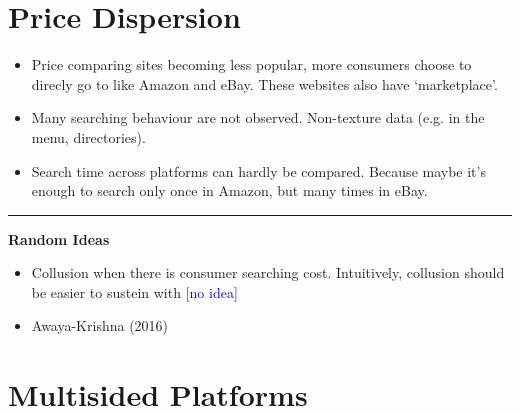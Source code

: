 \documentclass{book}
\theoremstyle{plain}
\theoremstyle{definition}
\newcommand{\myline}{\vspace{3mm} \hrule \vspace{4mm}}
\begin{document}




\section{Price Dispersion} %
\label{sec:price_dispersion}

\textbf{}

\begin{itemize}
	\item Price comparing sites becoming less popular,
	more consumers choose to direcly go to like Amazon and eBay.
	These websites also have `marketplace'.
	\item Many searching behaviour are not observed. Non-texture data (e.g. in the menu, directories).
	\item Search time across platforms can hardly be compared.
	Because maybe it's enough to search only once in Amazon, 
	but many times in eBay.
\end{itemize}

\myline

\noindent
\textbf{Random Ideas}
\begin{itemize}
	\item Collusion when there is consumer searching cost.
	Intuitively, collusion should be easier to sustein with 
	\textcolor{blue}{[no idea]}

	\item Awaya-Krishna (2016) 
\end{itemize}






\section{Multisided Platforms} %
\label{sec:multisided_platforms}
\end{document}
